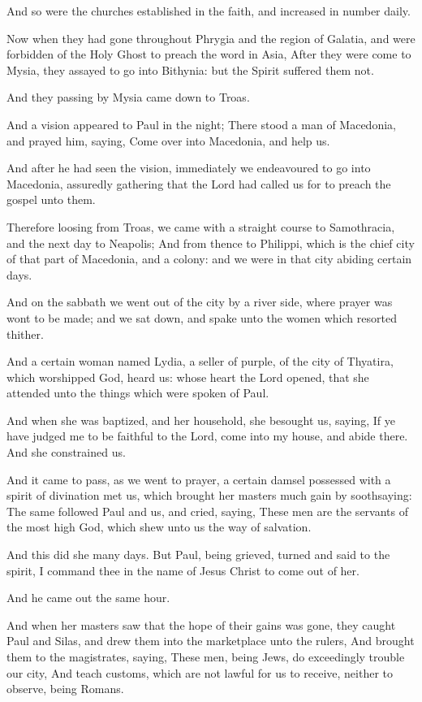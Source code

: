 \verse And so were the churches established in the faith, and increased in number daily.

\verse Now when they had gone throughout Phrygia and the region of Galatia, and were forbidden of the Holy Ghost to preach the word in Asia, \verse After they were come to Mysia, they assayed to go into Bithynia: but the Spirit suffered them not.

\verse And they passing by Mysia came down to Troas.

\verse And a vision appeared to Paul in the night; There stood a man of Macedonia, and prayed him, saying, Come over into Macedonia, and help us.

\verse And after he had seen the vision, immediately we endeavoured to go into Macedonia, assuredly gathering that the Lord had called us for to preach the gospel unto them.

\verse Therefore loosing from Troas, we came with a straight course to Samothracia, and the next day to Neapolis; \verse And from thence to Philippi, which is the chief city of that part of Macedonia, and a colony: and we were in that city abiding certain days.

\verse And on the sabbath we went out of the city by a river side, where prayer was wont to be made; and we sat down, and spake unto the women which resorted thither.

\verse And a certain woman named Lydia, a seller of purple, of the city of Thyatira, which worshipped God, heard us: whose heart the Lord opened, that she attended unto the things which were spoken of Paul.

\verse And when she was baptized, and her household, she besought us, saying, If ye have judged me to be faithful to the Lord, come into my house, and abide there. And she constrained us.

\verse And it came to pass, as we went to prayer, a certain damsel possessed with a spirit of divination met us, which brought her masters much gain by soothsaying: \verse The same followed Paul and us, and cried, saying, These men are the servants of the most high God, which shew unto us the way of salvation.

\verse And this did she many days. But Paul, being grieved, turned and said to the spirit, I command thee in the name of Jesus Christ to come out of her.

And he came out the same hour.

\verse And when her masters saw that the hope of their gains was gone, they caught Paul and Silas, and drew them into the marketplace unto the rulers, \verse And brought them to the magistrates, saying, These men, being Jews, do exceedingly trouble our city, \verse And teach customs, which are not lawful for us to receive, neither to observe, being Romans.

